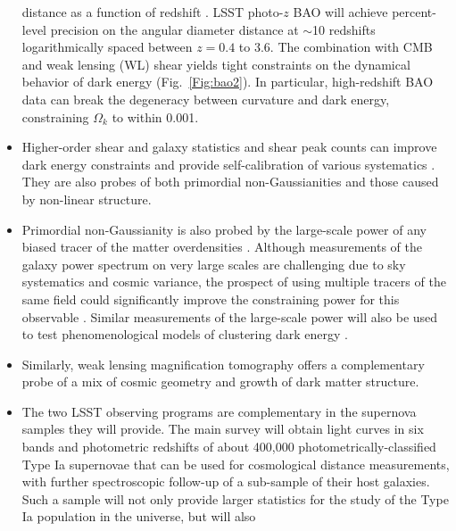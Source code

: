 \begin{itemize}
distance as a function of redshift
\citep{1998ApJ...504L..57E,2001ApJ...557L...7C,2003ApJ...594..665B,2003PhRvD..68f3004H,2003PhRvD..68h3504L,2003ApJ...598..720S}.
LSST photo-$z$ BAO will achieve percent-level precision on the angular
diameter distance at $\sim$10 redshifts logarithmically spaced between $z = 0.4$ to 3.6. The combination with CMB
and weak lensing (WL) shear yields tight constraints on the
dynamical behavior of dark energy (Fig.~\ref{Fig:bao2}). In particular, high-redshift BAO data can break
the degeneracy between curvature and dark energy, constraining $\Omega_k$ to within
0.001.
\item Higher-order shear and galaxy statistics and shear peak counts can improve dark energy
constraints and provide self-calibration of various systematics
\citep{2004MNRAS.348..897T,2006MNRAS.366..884D,2006MNRAS.366..101H,2016PhRvD..94f3534P}. They are also probes of both
primordial non-Gaussianities and those caused by non-linear structure.
\item Primordial non-Gaussianity is also probed by the large-scale power of any biased tracer of the matter
overdensities \citep{2008PhRvD..77l3514D}. Although measurements of the galaxy power spectrum on very large scales
are challenging due to sky systematics \citep{2014PhRvL.113v1301L} and cosmic variance, the prospect of using
multiple tracers of the same field could significantly improve the constraining power for this observable
\citep{2009PhRvL.102b1302S}. Similar measurements of the large-scale power will also be used to test phenomenological
models of clustering dark energy \citep{2006PhRvD..74d3505T}.
\item Similarly, weak lensing magnification tomography \citep{2012MNRAS.426.2489M} offers a
complementary probe of a mix of cosmic geometry and growth of dark matter structure.
\item The two LSST observing programs are complementary in the supernova samples they will provide. The main survey will
obtain light curves in six bands and photometric redshifts of about 400,000 photometrically-classified Type
Ia supernovae that can be used for cosmological distance measurements, with further spectroscopic
follow-up of a sub-sample of their host galaxies.
Such a sample will not only provide larger statistics
for the study of the Type Ia population in the universe, but will also

\end{itemize}
